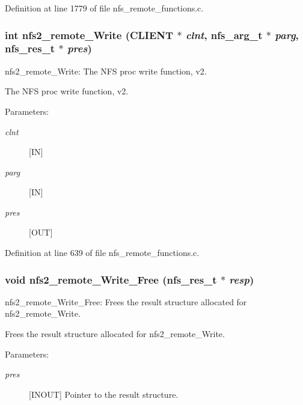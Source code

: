 Definition at line 1779 of file nfs\_\-remote\_\-functions.c.
\subsubsection[{nfs2\_\-remote\_\-Write}]{\setlength{\rightskip}{0pt plus 5cm}int nfs2\_\-remote\_\-Write (CLIENT $\ast$ {\em clnt}, \/  nfs\_\-arg\_\-t $\ast$ {\em parg}, \/  nfs\_\-res\_\-t $\ast$ {\em pres})}\label{group__NFSprocs_gd31d5793886c4e81d90bf579fbd16a04}


nfs2\_\-remote\_\-Write: The NFS proc write function, v2.

The NFS proc write function, v2.

\begin{Desc}
\item[Parameters:]
\begin{description}
\item[{\em clnt}][IN] \item[{\em parg}][IN] \item[{\em pres}][OUT] \end{description}
\end{Desc}


Definition at line 639 of file nfs\_\-remote\_\-functions.c.
\subsubsection[{nfs2\_\-remote\_\-Write\_\-Free}]{\setlength{\rightskip}{0pt plus 5cm}void nfs2\_\-remote\_\-Write\_\-Free (nfs\_\-res\_\-t $\ast$ {\em resp})}\label{group__NFSprocs_g5cbc34d26235e74b6ca5f867a48323dc}


nfs2\_\-remote\_\-Write\_\-Free: Frees the result structure allocated for nfs2\_\-remote\_\-Write.

Frees the result structure allocated for nfs2\_\-remote\_\-Write.

\begin{Desc}
\item[Parameters:]
\begin{description}
\item[{\em pres}][INOUT] Pointer to the result structure. \end{description}
\end{Desc}


